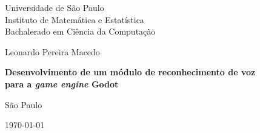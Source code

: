 \thispagestyle{empty}
\begin{center}
    \vspace*{2.3cm}
    Universidade de São Paulo \\
    Instituto de Matemática e Estatística \\
    Bachalerado em Ciência da Computação


    \vspace*{3cm}
    \large{Leonardo Pereira Macedo}


    \vspace{3cm}
    \textbf{\large{Desenvolvimento de um módulo de reconhecimento de voz \\
    para a \textit{game engine} Godot}}


    \vskip 5cm
    \normalsize{São Paulo}

    \today
\end{center}
